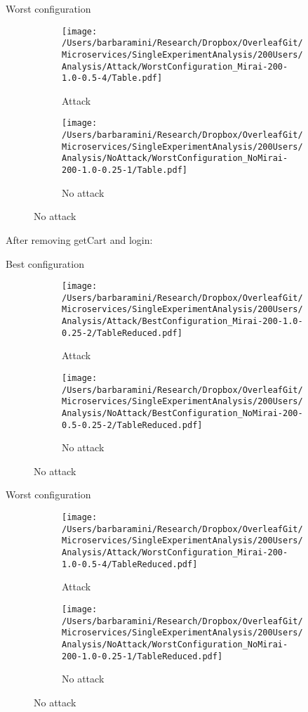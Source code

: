 \documentclass[10pt]{article}
\begin{document}
\break
Worst configuration \par
\begin{figure}[h]
\begin{subfigure}{.5\textwidth}
\texttt{[image: /Users/barbaramini/Research/Dropbox/OverleafGit/Microservices/SingleExperimentAnalysis/200Users/Analysis/Attack/WorstConfiguration\_Mirai-200-1.0-0.5-4/Table.pdf]}
\caption{Attack}
\end{subfigure}
\begin{subfigure}{.5\textwidth}
\texttt{[image: /Users/barbaramini/Research/Dropbox/OverleafGit/Microservices/SingleExperimentAnalysis/200Users/Analysis/NoAttack/WorstConfiguration\_NoMirai-200-1.0-0.25-1/Table.pdf]}
\caption{No attack}
\end{subfigure}
\end{figure}

\break
After removing  getCart and login:\par
Best configuration\par
\begin{figure}[h]
\begin{subfigure}{.5\textwidth}
\texttt{[image: /Users/barbaramini/Research/Dropbox/OverleafGit/Microservices/SingleExperimentAnalysis/200Users/Analysis/Attack/BestConfiguration\_Mirai-200-1.0-0.25-2/TableReduced.pdf]}
\caption{Attack}
\end{subfigure}
\begin{subfigure}{.5\textwidth}
\texttt{[image: /Users/barbaramini/Research/Dropbox/OverleafGit/Microservices/SingleExperimentAnalysis/200Users/Analysis/NoAttack/BestConfiguration\_NoMirai-200-0.5-0.25-2/TableReduced.pdf]}
\caption{No attack}
\end{subfigure}
\end{figure}
\break
Worst configuration \par
\begin{figure}[h]
\begin{subfigure}{.5\textwidth}
\texttt{[image: /Users/barbaramini/Research/Dropbox/OverleafGit/Microservices/SingleExperimentAnalysis/200Users/Analysis/Attack/WorstConfiguration\_Mirai-200-1.0-0.5-4/TableReduced.pdf]}
\caption{Attack}
\end{subfigure}
\begin{subfigure}{.5\textwidth}
\texttt{[image: /Users/barbaramini/Research/Dropbox/OverleafGit/Microservices/SingleExperimentAnalysis/200Users/Analysis/NoAttack/WorstConfiguration\_NoMirai-200-1.0-0.25-1/TableReduced.pdf]}
\caption{No attack}
\end{subfigure}
\end{figure}
\end{document}
